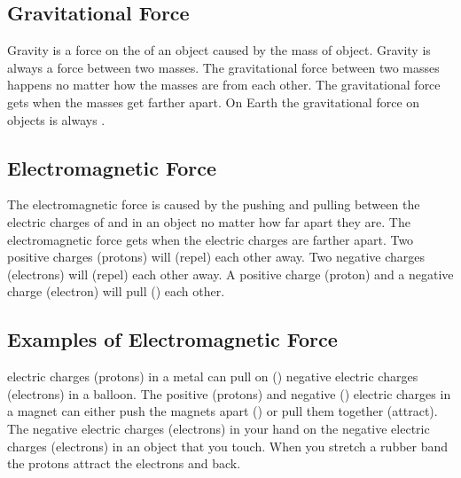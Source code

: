 \documentclass[12pt]{exam}
\begin{document}
\begin{questions}
\subsection{Gravitational Force}
\question Gravity is a force on the \fillin of an object caused by the mass of \fillin object.
\question Gravity is always a \fillin force between two masses.
\question The gravitational force between two masses happens no matter how \fillin the masses are from each other.
\question The gravitational force gets \fillin when the masses get farther apart.
\question On Earth the gravitational force on objects is always \fillin.

\subsection{Electromagnetic Force}

\question The electromagnetic force is caused by the pushing and pulling between the electric charges of \fillin and \fillin in an object no matter how far apart they are.
\question The electromagnetic force gets \fillin when the electric charges are farther apart.
\question Two positive charges (protons) will \fillin (repel) each other away.
\question Two negative charges (electrons) will \fillin (repel) each other away.
\question A positive charge (proton) and a negative charge (electron) will pull (\fillin) each other.

\subsection{Examples of Electromagnetic Force}

\question \fillin electric charges (protons) in a metal can pull on (\fillin) negative electric charges (electrons) in a balloon.
\question The positive (protons) and negative (\fillin) electric charges in a magnet can either push the magnets apart (\fillin) or pull them together (attract).
\question The negative electric charges (electrons) in your hand \fillin on the negative electric charges (electrons) in an object that you touch.
\question When you stretch a rubber band the protons attract the electrons and \fillin back.


\end{questions}


\pagebreak
\end{document}
